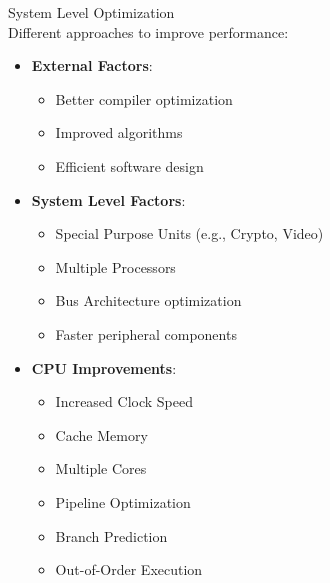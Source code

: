 \begin{corollary}{System Level Optimization}\\
Different approaches to improve performance:
\begin{itemize}
  \item \textbf{External Factors}:
    \begin{itemize}
      \item Better compiler optimization
      \item Improved algorithms
      \item Efficient software design
    \end{itemize}
  \item \textbf{System Level Factors}:
    \begin{itemize}
      \item Special Purpose Units (e.g., Crypto, Video)
      \item Multiple Processors
      \item Bus Architecture optimization
      \item Faster peripheral components
    \end{itemize}
  \item \textbf{CPU Improvements}:
    \begin{itemize}
      \item Increased Clock Speed
      \item Cache Memory
      \item Multiple Cores
      \item Pipeline Optimization
      \item Branch Prediction
      \item Out-of-Order Execution
    \end{itemize}
\end{itemize}
\end{corollary}

